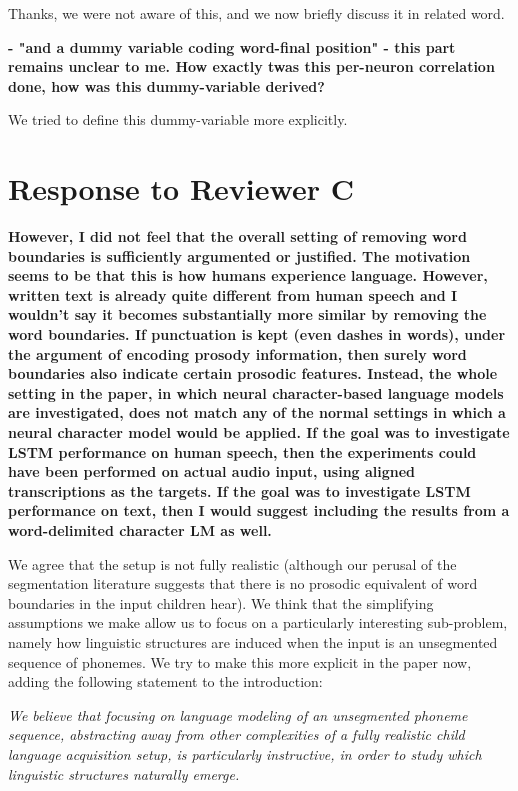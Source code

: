 \documentclass{article}[11pt,a4paper,oneside]
\begin{document}
Thanks, we were not aware of this, and we now briefly discuss it in related word.\newline

\textbf{- "and a dummy variable coding word-final position" - this part remains
unclear to me. How exactly twas this per-neuron correlation done, how was
this dummy-variable derived?}

We tried to define this dummy-variable more explicitly.

\section{Response to Reviewer C}

\textbf{
However, I did not feel that the overall setting of removing word boundaries
is sufficiently argumented or justified. The motivation seems to be that
this is how humans experience language. However, written text is already
quite different from human speech and I wouldn't say it becomes
substantially more similar by removing the word boundaries. If punctuation
is kept (even dashes in words), under the argument of encoding prosody
information, then surely word boundaries also indicate certain prosodic
features. Instead, the whole setting in the paper, in which neural
character-based language models are investigated, does not match any of the
normal settings in which a neural character model would be applied. If the
goal was to investigate LSTM performance on human speech, then the
experiments could have been performed on actual audio input, using aligned
transcriptions as the targets. If the goal was to investigate LSTM
performance on text, then I would suggest including the results from a
word-delimited character LM as well.}

We agree that the setup is not fully realistic (although our perusal of the segmentation literature suggests that there is no prosodic equivalent of word boundaries in the input children hear). We think that the simplifying assumptions we make allow us to focus on a particularly interesting sub-problem, namely how linguistic structures are induced when the input is an unsegmented sequence of phonemes. We try to make this more explicit in the paper now, adding the following statement to the introduction:

\textit{We believe that focusing on language modeling of an unsegmented phoneme sequence, abstracting away from other complexities of a fully realistic child language acquisition setup, is particularly instructive, in order to study which linguistic structures naturally emerge.}\newline
\end{document}
